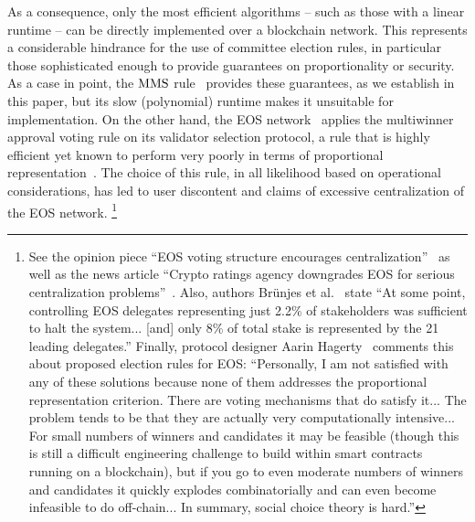 As a consequence, only the most efficient algorithms -- such as those with a linear runtime -- can be directly implemented over a blockchain network. This represents a considerable hindrance for the use of committee election rules, in particular those sophisticated enough to provide guarantees on proportionality or security. 
As a case in point, the $\operatorname{MMS}$ rule~\cite{sanchez2016maximin} provides these guarantees, as we establish in this paper, but its slow (polynomial) runtime makes it unsuitable for implementation. On the other hand, the EOS network~\cite{griggeos} applies the multiwinner approval voting rule on its validator selection protocol, a rule that is highly efficient yet known to perform very poorly in terms of proportional representation~\cite[Table 2]{lackner2020approval}. 
The choice of this rule, in all likelihood based on operational considerations, has led to user discontent and claims of excessive centralization of the EOS network.%
%
\footnote{See the opinion piece ``EOS voting structure encourages centralization''~\cite{garg} as well as the 
news article ``Crypto ratings agency downgrades EOS for serious centralization problems''~\cite{chong}. 
Also, authors Br{\"u}njes et al.~\cite{brunjes2020reward} state ``At some point, controlling EOS delegates representing just 2.2\% of stakeholders was sufficient to halt the system... [and] only 8\% of total stake is represented by the 21 leading delegates.'' 
Finally, protocol designer Aarin Hagerty~\cite{hagerty} comments this about proposed election rules for EOS: ``Personally, I am not satisfied with any of these solutions because none of them addresses the proportional representation criterion. There are voting mechanisms that do satisfy it... The problem tends to be that they are actually very computationally intensive... For small numbers of winners and candidates it may be feasible (though this is still a difficult engineering challenge to build within smart contracts running on a blockchain), but if you go to even moderate numbers of winners and candidates it quickly explodes combinatorially and can even become infeasible to do off-chain... In summary, social choice theory is hard.''}

